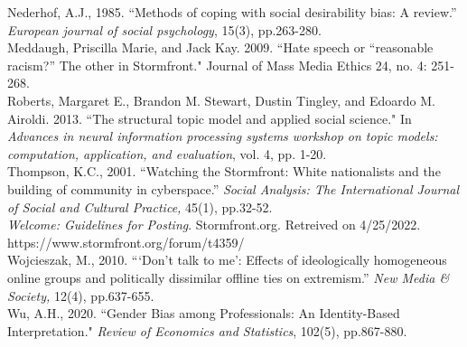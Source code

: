 \documentclass[12pt]{paper}
\begin{document}
\begin{hangparas}{.25in}{1}
Nederhof, A.J., 1985. ``Methods of coping with social desirability bias: A review.” \textit{European journal of social psychology}, 15(3), pp.263-280.
\\


Meddaugh, Priscilla Marie, and Jack Kay. 2009. ``Hate speech or ``reasonable racism?” The other in Stormfront." Journal of Mass Media Ethics 24, no. 4: 251-268.
\\


Roberts, Margaret E., Brandon M. Stewart, Dustin Tingley, and Edoardo M. Airoldi. 2013. ``The structural topic model and applied social science." In \textit{Advances in neural information processing systems workshop on topic models: computation, application, and evaluation}, vol. 4, pp. 1-20.
\\


Thompson, K.C., 2001. ``Watching the Stormfront: White nationalists and the building of community in cyberspace.” \textit{Social Analysis: The International Journal of Social and Cultural Practice,} 45(1), pp.32-52.
\\


\textit{Welcome: Guidelines for Posting}. Stormfront.org. Retreived on 4/25/2022. https://www.stormfront.org/forum/t4359/
\\


Wojcieszak, M., 2010. ```Don’t talk to me’: Effects of ideologically homogeneous online groups and politically dissimilar offline ties on extremism.” \textit{New Media \& Society,} 12(4), pp.637-655.
\\


Wu, A.H., 2020. ``Gender Bias among Professionals: An Identity-Based Interpretation." \textit{Review of Economics and Statistics}, 102(5), pp.867-880.
\end{hangparas}
\end{document}
